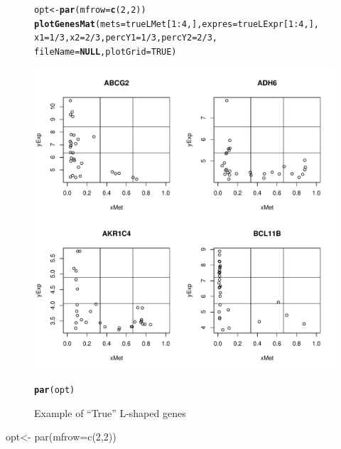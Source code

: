 \documentclass[a4paper,10pt]{article}\usepackage[]{graphicx}\usepackage[]{color}
\makeatletter
\def\maxwidth{ %
  \ifdim\Gin@nat@width>\linewidth
    \linewidth
  \else
    \Gin@nat@width
  \fi
}
\newcommand{\hlnum}[1]{\textcolor[rgb]{0.686,0.059,0.569}{#1}}%
\newcommand{\hlopt}[1]{\textcolor[rgb]{0,0,0}{#1}}%
\newcommand{\hlstd}[1]{\textcolor[rgb]{0.345,0.345,0.345}{#1}}%
\newcommand{\hlkwa}[1]{\textcolor[rgb]{0.161,0.373,0.58}{\textbf{#1}}}%
\newcommand{\hlkwb}[1]{\textcolor[rgb]{0.69,0.353,0.396}{#1}}%
\newcommand{\hlkwc}[1]{\textcolor[rgb]{0.333,0.667,0.333}{#1}}%
\newcommand{\hlkwd}[1]{\textcolor[rgb]{0.737,0.353,0.396}{\textbf{#1}}}%
\newenvironment{kframe}{%
 \def\at@end@of@kframe{}%
 \ifinner\ifhmode%
  \def\at@end@of@kframe{\end{minipage}}%
  \begin{minipage}{\columnwidth}%
 \fi\fi%
 \def\FrameCommand##1{\hskip\@totalleftmargin \hskip-\fboxsep
 \colorbox{shadecolor}{##1}\hskip-\fboxsep
     \hskip-\linewidth \hskip-\@totalleftmargin \hskip\columnwidth}%
 \MakeFramed {\advance\hsize-\width
   \@totalleftmargin\z@ \linewidth\hsize
   \@setminipage}}%
 {\par\unskip\endMakeFramed%
 \at@end@of@kframe}
\newenvironment{knitrout}{}{} %
\makeatother
\begin{document}
\begin{figure}
\centering
\begin{knitrout}
\color{fgcolor}\begin{kframe}
\begin{alltt}
\hlstd{opt}\hlkwb{<-} \hlkwd{par}\hlstd{(}\hlkwc{mfrow}\hlstd{=}\hlkwd{c}\hlstd{(}\hlnum{2}\hlstd{,}\hlnum{2}\hlstd{))}
\hlkwd{plotGenesMat} \hlstd{(}\hlkwc{mets}\hlstd{=trueLMet[}\hlnum{1}\hlopt{:}\hlnum{4}\hlstd{,],} \hlkwc{expres}\hlstd{=trueLExpr[}\hlnum{1}\hlopt{:}\hlnum{4}\hlstd{,],}
              \hlkwc{x1}\hlstd{=}\hlnum{1}\hlopt{/}\hlnum{3}\hlstd{,} \hlkwc{x2}\hlstd{=}\hlnum{2}\hlopt{/}\hlnum{3}\hlstd{,} \hlkwc{percY1}\hlstd{=}\hlnum{1}\hlopt{/}\hlnum{3}\hlstd{,} \hlkwc{percY2}\hlstd{=}\hlnum{2}\hlopt{/}\hlnum{3}\hlstd{,}
              \hlkwc{fileName}\hlstd{=}\hlkwa{NULL}\hlstd{,} \hlkwc{plotGrid} \hlstd{=} \hlnum{TRUE}\hlstd{)}
\end{alltt}
\end{kframe}
\includegraphics[width=\maxwidth]{figure/plotTRUE1-1} 
\begin{kframe}\begin{alltt}
\hlkwd{par}\hlstd{(opt)}
\end{alltt}
\end{kframe}
\end{knitrout}
\caption{Example of ``True'' L-shaped genes\label{Lshaped1}}
\end{figure}opt<- par(mfrow=c(2,2))
\end{document}
